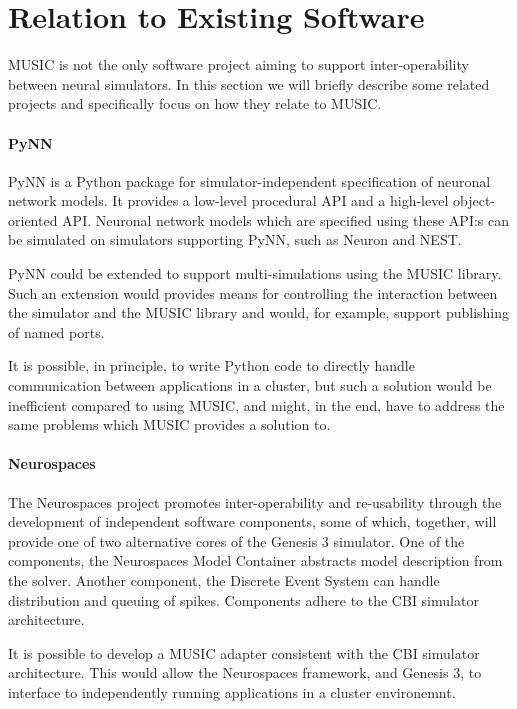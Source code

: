 \documentclass[a4paper,twoside]{report}
\begin{document}
\section{Relation to Existing Software}

MUSIC is not the only software project aiming to support
inter-operability between neural simulators.  In this section we will
briefly describe some related projects and specifically focus on how
they relate to MUSIC.

\paragraph{PyNN}

PyNN is a Python package for simulator-independent specification of
neuronal network models.  It provides a low-level procedural API and a
high-level object-oriented API.  Neuronal network models which are
specified using these API:s can be simulated on simulators supporting
PyNN, such as Neuron and NEST.

PyNN could be extended to support multi-simulations using the MUSIC
library.  Such an extension would provides means for controlling the
interaction between the simulator and the MUSIC library and would, for
example, support publishing of named ports.

It is possible, in principle, to write Python code to directly handle
communication between applications in a cluster, but such a solution
would be inefficient compared to using MUSIC, and might, in the end,
have to address the same problems which MUSIC provides a solution to.

\paragraph{Neurospaces}

The Neurospaces project promotes inter-operability and re-usability
through the development of independent software components, some of
which, together, will provide one of two alternative cores of the
Genesis 3 simulator.  One of the components, the Neurospaces Model
Container abstracts model description from the solver.  Another
component, the Discrete Event System can handle distribution and
queuing of spikes.  Components adhere to the CBI simulator
architecture.

It is possible to develop a MUSIC adapter consistent with the CBI
simulator architecture.  This would allow the Neurospaces framework,
and Genesis 3, to interface to independently running applications in a
cluster environemnt.
\end{document}
